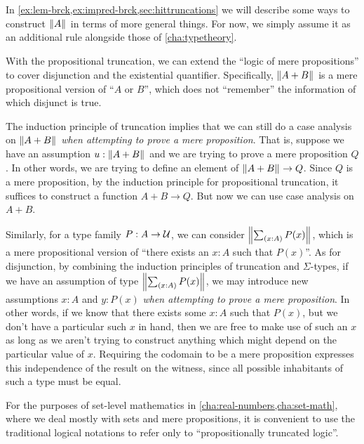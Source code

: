 In \autoref{ex:lem-brck,ex:impred-brck,sec:hittruncations} we will describe some ways to construct $\mathopen{}\left\Vert A\right\Vert_{}\mathclose{}$ in terms of more general things.
For now, we simply assume it as an additional rule alongside those of \autoref{cha:typetheory}.

With the propositional truncation, we can extend the ``logic of mere propositions'' to cover disjunction and the existential quantifier.
Specifically, $\mathopen{}\left\Vert A+B\right\Vert_{}\mathclose{}$ is a mere propositional version of ``$A$ or $B$'', which does not ``remember'' the information of which disjunct is true.

The induction principle of truncation implies that we can still do a case analysis on $\mathopen{}\left\Vert A+B\right\Vert_{}\mathclose{}$ \emph{when attempting to prove a mere proposition}.
That is, suppose we have an assumption $u:\mathopen{}\left\Vert A+B\right\Vert_{}\mathclose{}$ and we are trying to prove a mere proposition $Q$.
In other words, we are trying to define an element of $\mathopen{}\left\Vert A+B\right\Vert_{}\mathclose{} \to Q$.
Since $Q$ is a mere proposition, by the induction principle for propositional truncation, it suffices to construct a function $A+B\to Q$.
But now we can use case analysis on $A+B$.

Similarly, for a type family $P:A\to\mathcal{U}$, we can consider $\brck{\sm{x:A} P(x)}$, which is a mere propositional version of ``there exists an $x:A$ such that $P(x)$''.
As for disjunction, by combining the induction principles of truncation and $\Sigma$-types, if we have an assumption of type $\brck{\sm{x:A} P(x)}$, we may introduce new assumptions $x:A$ and $y:P(x)$ \emph{when attempting to prove a mere proposition}.
In other words, if we know that there exists some $x:A$ such that $P(x)$, but we don't have a particular such $x$ in hand, then we are free to make use of such an $x$ as long as we aren't trying to construct anything which might depend on the particular value of $x$.
Requiring the codomain to be a mere proposition expresses this independence of the result on the witness, since all possible inhabitants of such a type must be equal.

For the purposes of set-level mathematics in \autoref{cha:real-numbers,cha:set-math},
where we deal mostly with sets and mere propositions, it is convenient to use the
traditional logical notations to refer only to ``propositionally truncated logic''.

